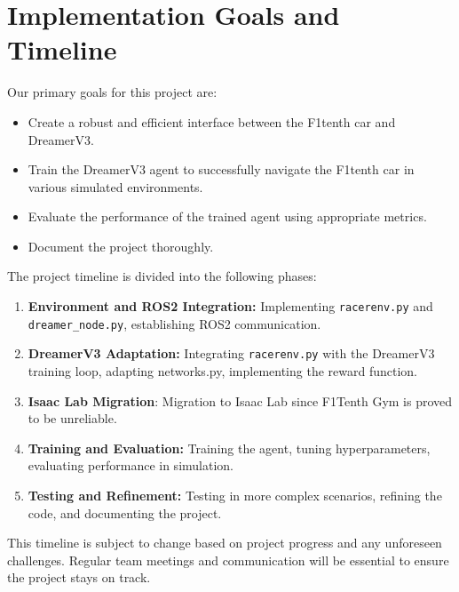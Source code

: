 \section{Implementation Goals and Timeline}

Our primary goals for this project are:

\begin{itemize}
    \item Create a robust and efficient interface between the F1tenth car and DreamerV3.
    \item Train the DreamerV3 agent to successfully navigate the F1tenth car in various simulated environments.
    \item Evaluate the performance of the trained agent using appropriate metrics.
    \item Document the project thoroughly.
\end{itemize}

The project timeline is divided into the following phases:

\begin{enumerate}
    \item \textbf{Environment and ROS2 Integration:} Implementing \texttt{racerenv.py} and \texttt{dreamer\_node.py}, establishing ROS2 communication.
    \item \textbf{DreamerV3 Adaptation:} Integrating \texttt{racerenv.py} with the DreamerV3 training loop, adapting networks.py, implementing the reward function.
    \item \textbf{Isaac Lab Migration}: Migration to Isaac Lab since F1Tenth Gym is proved to be unreliable.
    \item \textbf{Training and Evaluation:} Training the agent, tuning hyperparameters, evaluating performance in simulation.
    \item \textbf{Testing and Refinement:} Testing in more complex scenarios, refining the code, and documenting the project.
\end{enumerate}

This timeline is subject to change based on project progress and any unforeseen challenges.  Regular team meetings and communication will be essential to ensure the project stays on track.